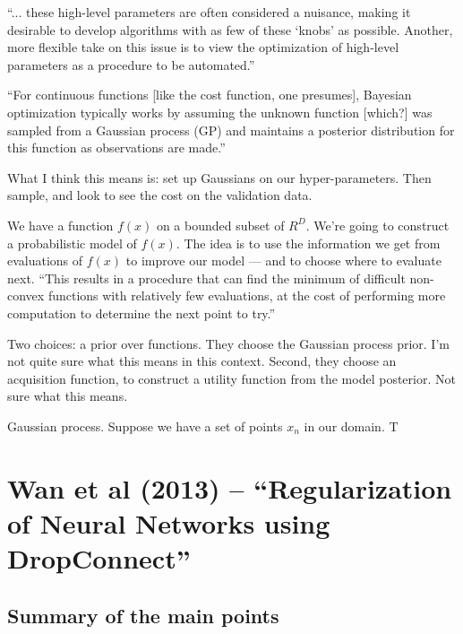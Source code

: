 \documentclass[12pt]{report}
\begin{document}
``... these high-level parameters are often considered a nuisance,
making it desirable to develop algorithms with as few of these `knobs'
as possible.  Another, more flexible take on this issue is to view the
optimization of high-level parameters as a procedure to be
automated.''

``For continuous functions [like the cost function, one presumes],
Bayesian optimization typically works by assuming the unknown function
[which?] was sampled from a Gaussian process (GP) and maintains a
posterior distribution for this function as observations are made.''

What I think this means is: set up Gaussians on our hyper-parameters.
Then sample, and look to see the cost on the validation data.

We have a function $f(x)$ on a bounded subset of $R^D$.  We're going
to construct a probabilistic model of $f(x)$.  The idea is to use the
information we get from evaluations of $f(x)$ to improve our model ---
and to choose where to evaluate next.  ``This results in a procedure
that can find the minimum of difficult non-convex functions with
relatively few evaluations, at the cost of performing more computation
to determine the next point to try.''

Two choices: a prior over functions.  They choose the Gaussian process
prior.  I'm not quite sure what this means in this context.  Second,
they choose an acquisition function, to construct a utility function
from the model posterior.  Not sure what this means.

Gaussian process.  Suppose we have a set of points $x_n$ in our
domain.  T

\section{Wan et al (2013) -- ``Regularization of Neural Networks using
  DropConnect''}

\subsection{Summary of the main points} 
\end{document}
